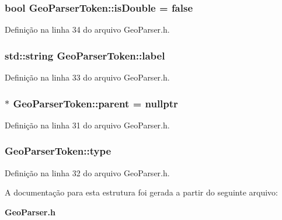 \subsubsection[{is\+Double}]{\setlength{\rightskip}{0pt plus 5cm}bool Geo\+Parser\+Token\+::is\+Double = false}\label{struct_geo_parser_token_adca914c59794ad92d1ad92c266be19cc}


Definição na linha 34 do arquivo Geo\+Parser.\+h.

\subsubsection[{label}]{\setlength{\rightskip}{0pt plus 5cm}std\+::string Geo\+Parser\+Token\+::label}\label{struct_geo_parser_token_a2568bee3b2fa027027808567433522ec}


Definição na linha 33 do arquivo Geo\+Parser.\+h.

\subsubsection[{parent}]{$\ast$ Geo\+Parser\+Token\+::parent = nullptr}\label{struct_geo_parser_token_a69b0a8960d908a00a536b0aed02df819}


Definição na linha 31 do arquivo Geo\+Parser.\+h.

\subsubsection[{type}]{ Geo\+Parser\+Token\+::type}\label{struct_geo_parser_token_a139a79dec7c7103e1a65f1b008cfc797}


Definição na linha 32 do arquivo Geo\+Parser.\+h.



A documentação para esta estrutura foi gerada a partir do seguinte arquivo\+:\begin{DoxyCompactItemize}
\item 
{\bf Geo\+Parser.\+h}\end{DoxyCompactItemize}
